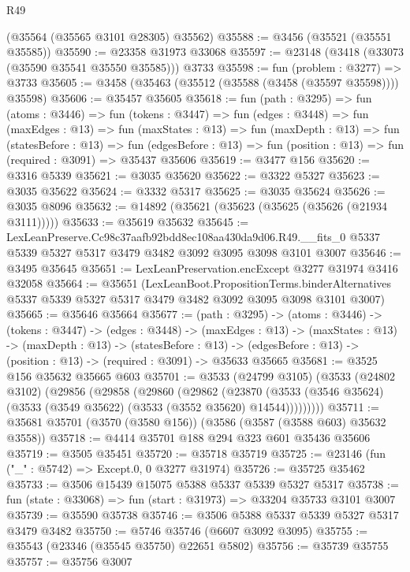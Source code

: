 \begin{lexlean}{R49}
\begin{coremodule}
    (@35564 (@35565 @3101 @28305) @35562)
@35588 := @3456 (@35521 (@35551 @35585))
@35590 := @23358 @31973 @33068
@35597 := @23148 (@3418 (@33073 (@35590 @35541 @35550 @35585))) @3733
@35598 := fun (problem : @3277) => @3733
@35605 := @3458 (@35463 (@35512 (@35588 (@3458 (@35597 @35598)))) @35598)
@35606 := @35457 @35605
@35618 := fun (path : @3295) =>
  fun (atoms : @3446) =>
  fun (tokens : @3447) =>
  fun (edges : @3448) =>
  fun (maxEdges : @13) =>
  fun (maxStates : @13) =>
  fun (maxDepth : @13) =>
  fun (statesBefore : @13) =>
  fun (edgesBefore : @13) => fun (position : @13) => fun (required : @3091) => @35437 @35606
@35619 := @3477 @156
@35620 := @3316 @5339
@35621 := @3035 @35620
@35622 := @3322 @5327
@35623 := @3035 @35622
@35624 := @3332 @5317
@35625 := @3035 @35624
@35626 := @3035 @8096
@35632 := @14892 (@35621 (@35623 (@35625 (@35626 (@21934 @3111)))))
@35633 := @35619 @35632
@35645 := LexLeanPreserve.Cc98c37aafb92bdd8ec108aa430da9d06.R49.__fits_0
    @5337
    @5339
    @5327
    @5317
    @3479
    @3482
    @3092
    @3095
    @3098
    @3101
    @3007
@35646 := @3495 @35645
@35651 := LexLeanPreservation.encExcept @3277 @31974 @3416 @32058
@35664 := @35651
    (LexLeanBoot.PropositionTerms.binderAlternatives
      @5337
      @5339
      @5327
      @5317
      @3479
      @3482
      @3092
      @3095
      @3098
      @3101
      @3007)
@35665 := @35646 @35664
@35677 := (path : @3295) ->
  (atoms : @3446) ->
  (tokens : @3447) ->
  (edges : @3448) ->
  (maxEdges : @13) ->
  (maxStates : @13) ->
  (maxDepth : @13) ->
  (statesBefore : @13) ->
  (edgesBefore : @13) -> (position : @13) -> (required : @3091) -> @35633 @35665
@35681 := @3525 @156 @35632 @35665 @603
@35701 := @3533
    (@24799 @3105)
    (@3533
      (@24802 @3102)
      (@29856
        (@29858
          (@29860
            (@29862
              (@23870
                (@3533 (@3546 @35624) (@3533 (@3549 @35622) (@3533 (@3552 @35620) @14544)))))))))
@35711 := @35681 @35701 (@3570 (@3580 @156)) (@3586 (@3587 (@3588 @603) @35632 @3558))
@35718 := @4414 @35701 @188 @294 @323 @601 @35436 @35606
@35719 := @3505 @35451
@35720 := @35718 @35719
@35725 := @23146 (fun ("_" : @5742) => Except.{0, 0} @3277 @31974)
@35726 := @35725 @35462
@35733 := @3506 @15439 @15075 @5388 @5337 @5339 @5327 @5317
@35738 := fun (state : @33068) => fun (start : @31973) => @33204 @35733 @3101 @3007
@35739 := @35590 @35738
@35746 := @3506 @5388 @5337 @5339 @5327 @5317 @3479 @3482
@35750 := @5746 @35746 (@6607 @3092 @3095)
@35755 := @35543 (@23346 (@35545 @35750) @22651 @5802)
@35756 := @35739 @35755
@35757 := @35756 @3007

\end{coremodule}
\end{lexlean}
